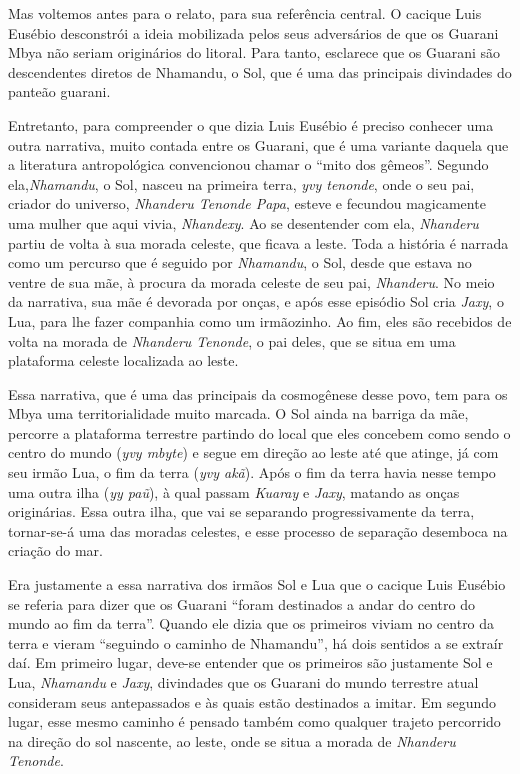 Mas voltemos antes para o relato, para sua referência central. O cacique
Luis Eusébio desconstrói a ideia mobilizada pelos seus adversários de
que os Guarani Mbya não seriam originários do litoral. Para tanto,
esclarece que os Guarani são descendentes diretos de Nhamandu, o Sol,
que é uma das principais divindades do panteão guarani. 

Entretanto, para compreender o que dizia Luis Eusébio é preciso conhecer
uma outra narrativa, muito contada entre os Guarani, que é uma variante
daquela que a literatura antropológica convencionou chamar o ``mito dos
gêmeos''. Segundo ela,\emph{Nhamandu}, o Sol, nasceu na primeira terra, \emph{yvy
tenonde}, onde o seu pai, criador do universo, \emph{Nhanderu Tenonde Papa},
esteve e fecundou magicamente uma mulher que aqui vivia, \emph{Nhandexy}. Ao
se desentender com ela, \emph{Nhanderu} partiu de volta à sua morada celeste,
que ficava a leste. Toda a história é narrada como um percurso que é
seguido por \emph{Nhamandu}, o Sol, desde que estava no ventre de sua mãe, à
procura da morada celeste de seu pai, \emph{Nhanderu}. No meio da narrativa,
sua mãe é devorada por onças, e após esse episódio Sol cria \emph{Jaxy}, o
Lua, para lhe fazer companhia como um irmãozinho. Ao fim, eles são
recebidos de volta na morada de \emph{Nhanderu Tenonde}, o pai deles, que se
situa em uma plataforma celeste localizada ao leste.

Essa narrativa, que é uma das principais da cosmogênese desse povo, tem
para os Mbya uma territorialidade muito marcada. O Sol ainda na barriga
da mãe, percorre a plataforma terrestre partindo do local que eles
concebem como sendo o centro do mundo (\emph{yvy mbyte}) e segue em direção ao
leste até que atinge, já com seu irmão Lua, o fim da terra (\emph{yvy akã}).
Após o fim da terra havia nesse tempo uma outra ilha (\emph{yy paũ}), à qual
passam \emph{Kuaray} e \emph{Jaxy}, matando as onças originárias. Essa outra ilha,
que vai se separando progressivamente da terra, tornar-se-á uma das
moradas celestes, e esse processo de separação desemboca na criação do
mar. 

Era justamente a essa narrativa dos irmãos Sol e Lua que o cacique Luis
Eusébio se referia para dizer  que os Guarani ``foram destinados a andar
do centro do mundo ao fim da terra''. Quando ele dizia que os primeiros
viviam no centro da terra e vieram ``seguindo o caminho de Nhamandu'', há
dois sentidos a se extraír daí. Em primeiro lugar, deve-se entender que
os primeiros são justamente Sol e Lua, \emph{Nhamandu} e \emph{Jaxy}, divindades que
os Guarani do mundo terrestre atual consideram seus antepassados e às
quais estão destinados a imitar. Em segundo lugar, esse mesmo caminho é
pensado também como qualquer trajeto percorrido na direção do sol
nascente, ao leste, onde se situa a morada de \emph{Nhanderu Tenonde}.

